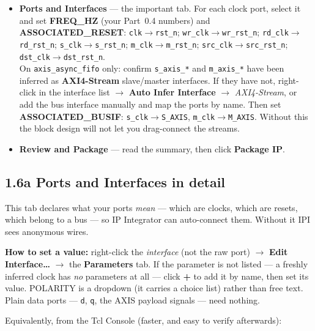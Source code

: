 \documentclass[10pt,a4paper]{article}
\newcommand{\code}[1]{\texttt{\small #1}}
\begin{document}
\begin{itemize}[leftmargin=1.2em, itemsep=2pt]
  \code{AF\_LEVEL}, \code{AE\_LEVEL};
  \code{axis\_async\_fifo} $\to$ \code{TDATA\_W}, \code{DEPTH}, \code{STAGES};
  \code{handshake\_mcp} $\to$ \code{WIDTH}, \code{STAGES}.
\item \textbf{Ports and Interfaces} --- the important tab. For each clock port,
  select it and set \textbf{FREQ\_HZ} (your Part~0.4 numbers) and
  \textbf{ASSOCIATED\_RESET}:
  \code{clk}$\to$\code{rst\_n}; \code{wr\_clk}$\to$\code{wr\_rst\_n};
  \code{rd\_clk}$\to$\code{rd\_rst\_n}; \code{s\_clk}$\to$\code{s\_rst\_n};
  \code{m\_clk}$\to$\code{m\_rst\_n}; \code{src\_clk}$\to$\code{src\_rst\_n};
  \code{dst\_clk}$\to$\code{dst\_rst\_n}.
  \\[2pt]
  On \code{axis\_async\_fifo} only: confirm \code{s\_axis\_*} and \code{m\_axis\_*}
  have been inferred as \textbf{AXI4-Stream} slave/master interfaces. If they have
  not, right-click in the interface list $\to$ \textbf{Auto Infer Interface} $\to$
  \emph{AXI4-Stream}, or add the bus interface manually and map the ports by name.
  Then set \textbf{ASSOCIATED\_BUSIF}: \code{s\_clk}$\to$\code{S\_AXIS},
  \code{m\_clk}$\to$\code{M\_AXIS}. Without this the block design will not let you
  drag-connect the streams.
\item \textbf{Review and Package} --- read the summary, then click
  \textbf{Package IP}.
\end{itemize}

\subsection{1.6a Ports and Interfaces in detail}

This tab declares what your ports \emph{mean} --- which are clocks, which are
resets, which belong to a bus --- so IP Integrator can auto-connect them. Without it
IPI sees anonymous wires.

\textbf{How to set a value:} right-click the \emph{interface} (not the raw port)
$\to$ \textbf{Edit Interface\ldots} $\to$ the \textbf{Parameters} tab. If the
parameter is not listed --- a freshly inferred clock has \emph{no} parameters at all
--- click \textbf{+} to add it by name, then set its value. POLARITY is a dropdown
(it carries a choice list) rather than free text. Plain data ports --- \code{d},
\code{q}, the AXIS payload signals --- need nothing.

Equivalently, from the Tcl Console (faster, and easy to verify afterwards):

\end{document}
